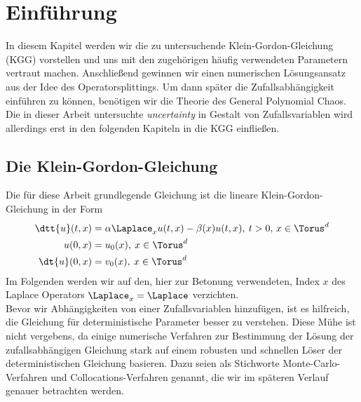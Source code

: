 
\chapter{Einführung}
In diesem Kapitel werden wir die zu untersuchende Klein-Gordon-Gleichung (KGG) vorstellen und uns mit den zugehörigen häufig verwendeten Parametern vertraut machen. Anschließend gewinnen wir einen numerischen Lösungsansatz aus der Idee des Operatorsplittings. Um dann später die Zufallsabhängigkeit einführen zu können, benötigen wir die Theorie des General Polynomial Chaos. Die in dieser Arbeit untersuchte \emph{uncertainty} in Gestalt von Zufallsvariablen wird allerdings erst in den folgenden Kapiteln in die KGG einfließen.
\label{Chapter1}

\section{Die Klein-Gordon-Gleichung}
Die für diese Arbeit grundlegende Gleichung ist die lineare Klein-Gordon-Gleichung in der Form
\begin{align}
\label{kgg}
\dtt{u}(t,x)&=\alpha \Laplace_x u(t,x) - \beta(x)u(t,x), \: t>0, \, x\in \Torus^d\\
u(0,x)&=u_0(x), \: x\in \Torus^d\\
\dt{u}(0,x)&=v_0(x), \: x\in \Torus^d
\end{align}
Im Folgenden werden wir auf den, hier zur Betonung verwendeten, Index $x$ des Laplace Operators $\Laplace_x=\Laplace$ verzichten.\\
Bevor wir Abhängigkeiten von einer Zufallsvariablen hinzufügen, ist es hilfreich, die Gleichung für deterministische Parameter besser zu verstehen. Diese Mühe ist nicht vergebens, da einige numerische Verfahren zur Bestimmung der Lösung der zufallsabhängigen Gleichung stark auf einem robusten und schnellen Löser der deterministischen Gleichung basieren. Dazu seien als Stichworte Monte-Carlo-Verfahren und Collocations-Verfahren genannt, die wir im späteren Verlauf genauer betrachten werden.
